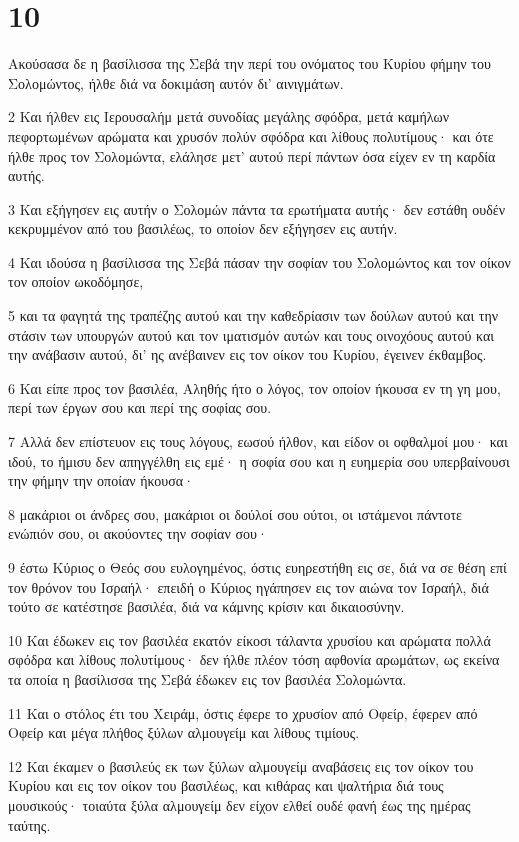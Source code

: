 \chapter{10}

\par Ακούσασα δε η βασίλισσα της Σεβά την περί του ονόματος του Κυρίου φήμην του Σολομώντος, ήλθε διά να δοκιμάση αυτόν δι' αινιγμάτων.
\par 2 Και ήλθεν εις Ιερουσαλήμ μετά συνοδίας μεγάλης σφόδρα, μετά καμήλων πεφορτωμένων αρώματα και χρυσόν πολύν σφόδρα και λίθους πολυτίμους· και ότε ήλθε προς τον Σολομώντα, ελάλησε μετ' αυτού περί πάντων όσα είχεν εν τη καρδία αυτής.
\par 3 Και εξήγησεν εις αυτήν ο Σολομών πάντα τα ερωτήματα αυτής· δεν εστάθη ουδέν κεκρυμμένον από του βασιλέως, το οποίον δεν εξήγησεν εις αυτήν.
\par 4 Και ιδούσα η βασίλισσα της Σεβά πάσαν την σοφίαν του Σολομώντος και τον οίκον τον οποίον ωκοδόμησε,
\par 5 και τα φαγητά της τραπέζης αυτού και την καθεδρίασιν των δούλων αυτού και την στάσιν των υπουργών αυτού και τον ιματισμόν αυτών και τους οινοχόους αυτού και την ανάβασιν αυτού, δι' ης ανέβαινεν εις τον οίκον του Κυρίου, έγεινεν έκθαμβος.
\par 6 Και είπε προς τον βασιλέα, Αληθής ήτο ο λόγος, τον οποίον ήκουσα εν τη γη μου, περί των έργων σου και περί της σοφίας σου.
\par 7 Αλλά δεν επίστευον εις τους λόγους, εωσού ήλθον, και είδον οι οφθαλμοί μου· και ιδού, το ήμισυ δεν απηγγέλθη εις εμέ· η σοφία σου και η ευημερία σου υπερβαίνουσι την φήμην την οποίαν ήκουσα·
\par 8 μακάριοι οι άνδρες σου, μακάριοι οι δούλοί σου ούτοι, οι ιστάμενοι πάντοτε ενώπιόν σου, οι ακούοντες την σοφίαν σου·
\par 9 έστω Κύριος ο Θεός σου ευλογημένος, όστις ευηρεστήθη εις σε, διά να σε θέση επί τον θρόνον του Ισραήλ· επειδή ο Κύριος ηγάπησεν εις τον αιώνα τον Ισραήλ, διά τούτο σε κατέστησε βασιλέα, διά να κάμνης κρίσιν και δικαιοσύνην.
\par 10 Και έδωκεν εις τον βασιλέα εκατόν είκοσι τάλαντα χρυσίου και αρώματα πολλά σφόδρα και λίθους πολυτίμους· δεν ήλθε πλέον τόση αφθονία αρωμάτων, ως εκείνα τα οποία η βασίλισσα της Σεβά έδωκεν εις τον βασιλέα Σολομώντα.
\par 11 Και ο στόλος έτι του Χειράμ, όστις έφερε το χρυσίον από Οφείρ, έφερεν από Οφείρ και μέγα πλήθος ξύλων αλμουγείμ και λίθους τιμίους.
\par 12 Και έκαμεν ο βασιλεύς εκ των ξύλων αλμουγείμ αναβάσεις εις τον οίκον του Κυρίου και εις τον οίκον του βασιλέως, και κιθάρας και ψαλτήρια διά τους μουσικούς· τοιαύτα ξύλα αλμουγείμ δεν είχον ελθεί ουδέ φανή έως της ημέρας ταύτης.
